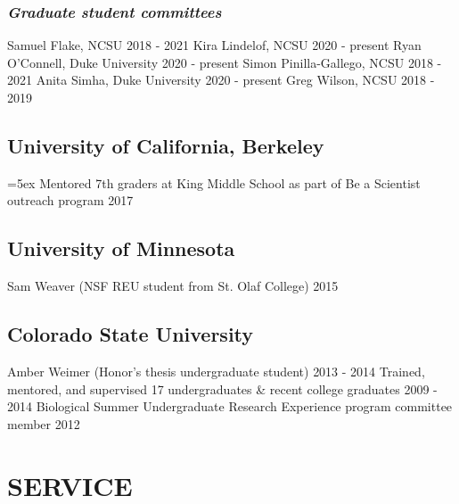 \documentclass[11pt,english]{article}\usepackage[]{graphicx}\usepackage[]{color}
\begin{document}
\subsubsection*{\emph{Graduate student committees}}
Samuel Flake, NCSU \hfill {2018 - 2021} \newline
Kira Lindelof, NCSU \hfill {2020 - present} \newline
Ryan O'Connell, Duke University \hfill {2020 - present} \newline
Simon Pinilla-Gallego, NCSU \hfill {2018 - 2021} \newline
Anita Simha, Duke University \hfill {2020 - present} \newline
Greg Wilson, NCSU \hfill {2018 - 2019} 

\subsection*{University of California, Berkeley}
\hangindent=5ex Mentored 7th graders at King Middle School as part of Be a Scientist outreach program \hfill {2017} 

\subsection*{University of Minnesota}
Sam Weaver (NSF REU student from St. Olaf College)		 \hfill {2015} 

\subsection*{Colorado State University}
Amber Weimer (Honor's thesis undergraduate student)		 \hfill {2013 - 2014} \newline
Trained, mentored, and supervised 17 undergraduates \& recent college graduates		 \hfill {2009 - 2014} \newline
Biological Summer Undergraduate Research Experience program committee member \hfill {2012} 

\vspace{1.5ex}
\section*{SERVICE}
\vspace{-0.5ex}
\end{document}
